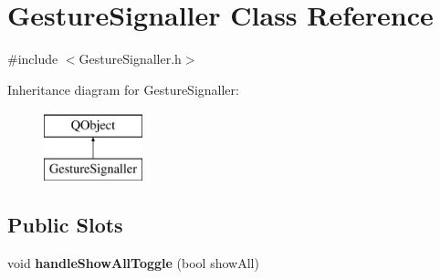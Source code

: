 \hypertarget{class_gesture_signaller}{\section{Gesture\+Signaller Class Reference}
\label{class_gesture_signaller}
}


{\ttfamily \#include $<$Gesture\+Signaller.\+h$>$}

Inheritance diagram for Gesture\+Signaller\+:\begin{figure}[H]
\begin{center}
\leavevmode
\includegraphics[height=2.000000cm]{class_gesture_signaller}
\end{center}
\end{figure}
\subsection*{Public Slots}
\begin{DoxyCompactItemize}
\item 
\hypertarget{class_gesture_signaller_a274c5b162f1067b917c141976a178c00}{void {\bfseries handle\+Show\+All\+Toggle} (bool show\+All)}\label{class_gesture_signaller_a274c5b162f1067b917c141976a178c00}

\end{DoxyCompactItemize}
